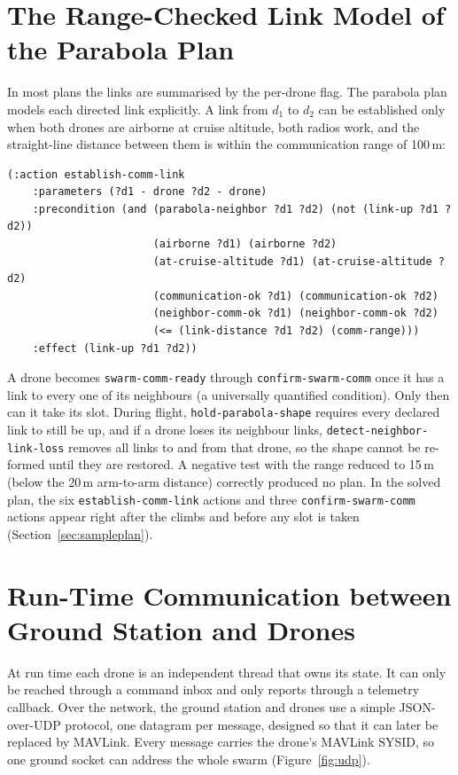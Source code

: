 \documentclass[11pt,a4paper,oneside]{report}
\newcommand{\code}[1]{\texttt{#1}}
\begin{document}
\section{The Range-Checked Link Model of the Parabola Plan}\label{sec:paracomm}
In most plans the links are summarised by the per-drone flag. The parabola plan models each
directed link explicitly. A link from $d_1$ to $d_2$ can be established only when both drones
are airborne at cruise altitude, both radios work, and the straight-line distance between them
is within the communication range of 100\,m:

\begin{lstlisting}
(:action establish-comm-link
    :parameters (?d1 - drone ?d2 - drone)
    :precondition (and (parabola-neighbor ?d1 ?d2) (not (link-up ?d1 ?d2))
                       (airborne ?d1) (airborne ?d2)
                       (at-cruise-altitude ?d1) (at-cruise-altitude ?d2)
                       (communication-ok ?d1) (communication-ok ?d2)
                       (neighbor-comm-ok ?d1) (neighbor-comm-ok ?d2)
                       (<= (link-distance ?d1 ?d2) (comm-range)))
    :effect (link-up ?d1 ?d2))
\end{lstlisting}

\noindent A drone becomes \code{swarm-comm-ready} through \code{confirm-swarm-comm} once it has
a link to every one of its neighbours (a universally quantified condition). Only then can it
take its slot. During flight, \code{hold-parabola-shape} requires every declared link to still be
up, and if a drone loses its neighbour links, \code{detect-neighbor-link-loss} removes all links
to and from that drone, so the shape cannot be re-formed until they are restored. A negative test
with the range reduced to 15\,m (below the 20\,m arm-to-arm distance) correctly produced no plan.
In the solved plan, the six \code{establish-comm-link} actions and three
\code{confirm-swarm-comm} actions appear right after the climbs and before any slot is taken
(Section~\ref{sec:sampleplan}).

\section{Run-Time Communication between Ground Station and Drones}
At run time each drone is an independent thread that owns its state. It can only be reached
through a command inbox and only reports through a telemetry callback. Over the network, the
ground station and drones use a simple JSON-over-UDP protocol, one datagram per message, designed
so that it can later be replaced by MAVLink. Every message carries the drone's
MAVLink SYSID, so one ground socket can address the whole swarm
(Figure~\ref{fig:udp}).
\end{document}
